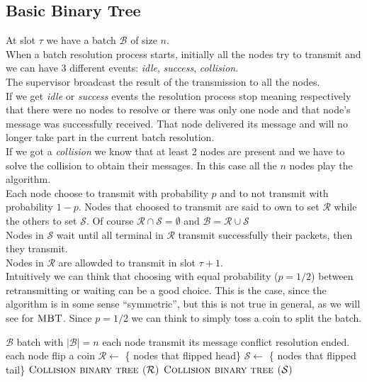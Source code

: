 \documentclass[12pt,a4paper,twocolumns]{report}
\newcommand{\algname}[1]{\ensuremath{\mbox{\sc #1}}}
\begin{document}
\subsection{Basic Binary Tree}
\label{basicbinarytreedescription}
At slot $\tau$ we have a batch $\mathcal{B}$ of size $n$.\\
When a batch resolution process starts, initially all the nodes try to transmit and we can have 3 different events: \emph{idle}, \emph{success}, \emph{collision}.	\\
The supervisor broadcast the result of the transmission to all the nodes.\\
If we get \emph{idle} or  \emph{success} events the resolution process stop meaning respectively that there were no nodes to resolve or there was only one node and that node's message was successfully received. That node delivered its message and will no longer take part in the current batch resolution.\\
If we got a \emph{collision} we know that at least 2 nodes are present and we have to solve the collision to obtain their messages. In this case all the $n$ nodes play the algorithm.\\
Each node choose to transmit with probability $p$ and to not transmit with probability $1-p$. Nodes that choosed to transmit  are said to own to set $\mathcal{R}$ while the others to set $\mathcal{S}$. Of course $\mathcal{R}  \cap \mathcal{S} = \emptyset$ and $\mathcal{B} = \mathcal{R}  \cup \mathcal{S}$\\
Nodes in $\mathcal{S}$ wait until all terminal in $\mathcal{R}$ transmit successfully their packets, then they transmit.\\
Nodes in $\mathcal{R}$ are allowded to transmit in slot $\tau +1$.\\


Intuitively we can think that choosing with equal probability ($p=1/2$) between retransmitting or waiting can be a good choice. This is the case, since the algorithm is in some sense ``symmetric'', but this is not true in general, as we will see for \algname{MBT}. Since $p=1/2$ we can think to simply toss a coin to split the batch.\\


\begin{algorithm}[h!]
\caption{\algname{Collision binary tree ($\mathcal{B}$)}}
\label{alg:binarytree}
\begin{algorithmic}
\STATE {}
\REQUIRE $\mathcal{B}$ batch with $|\mathcal{B}|=n$
\STATE each node transmit its message
	\STATE conflict resolution ended.
\ELSE
	\STATE each node flip a coin
	\STATE $\mathcal{R} \gets$ \{ nodes that flipped head\}
	\STATE $\mathcal{S} \gets$ \{ nodes that flipped tail\}
	\STATE \algname{Collision binary tree ($\mathcal{R}$)}
	\STATE \algname{Collision binary tree ($\mathcal{S}$)}
\ENDIF
\end{algorithmic}
\end{algorithm}
\end{document}
